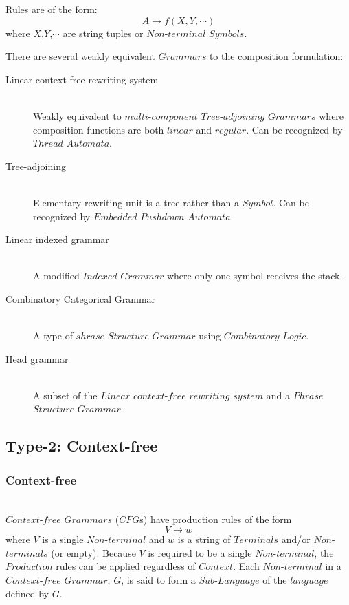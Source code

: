 \documentclass{article}
\begin{document}
Rules are of the form:
\[
    A \rightarrow f(X,Y,\cdots)
\]
where $X$,$Y$,$\cdots$ are string tuples or $Non$-$terminal$
$Symbols$.

There are several weakly equivalent $Grammars$ to the composition formulation:

\begin{description}
\item[Linear context-free rewriting system] \hfill \\
    Weakly equivalent to $multi$-$component$ $Tree$-$adjoining$
    $Grammars$ where composition functions are both $linear$ and
    $regular$. Can be recognized by $Thread$ $Automata$\cite{villemonte02}.

\item[Tree-adjoining] \hfill \\
    Elementary rewriting unit is a tree rather than a $Symbol$. Can be
    recognized by $Embedded$ $Pushdown$ $Automata$\cite{vijayashanker88}.

\item[Linear indexed grammar] \hfill \\
    A modified $Indexed$ $Grammar$ where only one symbol receives the
    stack.

\item[Combinatory Categorical Grammar] \hfill \\
    A type of $shrase$ $Structure$ $Grammar$ using $Combinatory$
    $Logic$.

\item[Head grammar] \hfill \\
    A subset of the $Linear$ $context$-$free$ $rewriting$ $system$ and
    a $Phrase$ $Structure$ $Grammar$.

\end{description}

\subsection{Type-2: Context-free}

\subsubsection{Context-free} \hfill \\
$Context$-$free$ $Grammars$ ($CFG$s) have production rules of the form
\[
    V \rightarrow w
\]
where $V$ is a single $Non$-$terminal$ and $w$ is a string of
$Terminals$ and/or $Non$-$terminals$ (or empty). Because $V$ is
required to be a single $Non$-$terminal$, the $Production$ rules can
be applied regardless of $Context$. Each $Non$-$terminal$ in a
$Context$-$free$ $Grammar$, $G$, is said to form a $Sub$-$Language$ of
the $language$ defined by $G$.
\end{document}
